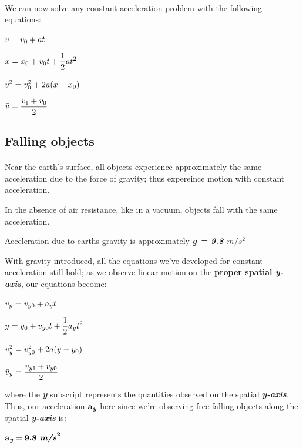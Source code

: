 \documentclass[12pt, a4paper]{article}
\begin{document}
\paragraph*{}
We can now solve any constant acceleration problem with the following equations:

{
    \centering
    $\mathlarger{v = v_0 + at}$

    $\mathlarger{x = x_0 + v_0t + \frac{1}{2}at^2}$

    $\mathlarger{v^2 = v_0^2 + 2a(x-x_0)}$

    $\mathlarger{\bar v = \frac{v_1 + v_0}{2}}$

}

\subsection{Falling objects}
\paragraph*{}
Near the earth's surface, all objects experience approximately the same acceleration
due to the force of gravity; thus expereince motion with constant acceleration.

In the absence of air resistance, like in a vacuum, objects fall with the same  acceleration.

Acceleration due to earths gravity is approximately \textbf{\textit{g = 9.8 $m/s^2$}}

With gravity introduced, all the equations we've developed for constant acceleration still hold; as 
we observe linear motion on the \textbf{proper spatial \textit{y-axis}}, our equations become:

{
    \centering
    $\mathlarger{v_y = v_{y0} + a_yt}$

    $\mathlarger{y = y_0 + v_{y0}t + \frac{1}{2}a_yt^2}$

    $\mathlarger{v_y^2 = v_{y0}^2 + 2a(y-y_0)}$

    $\mathlarger{\bar v_y = \frac{v_{y1} + v_{y0}}{2}}$

}

where the \textbf{\textit{y}} subscript represents the quantities observed on the spatial \textbf{\textit{y-axis}}. Thus,
our acceleration $\textrm{\textbf{a}}_\textrm{\textbf{\textit{y}}}$ here since we're observing free falling objects along the spatial \textbf{\textit{y-axis}}
is:

{
    \centering
    $\textrm{\textbf{a}}_\textrm{\textbf{\textit{y}}} = \textrm{\textbf{9.8
    \textit{m/s}}}^\textrm{\textbf{2}}$

}
\end{document}
